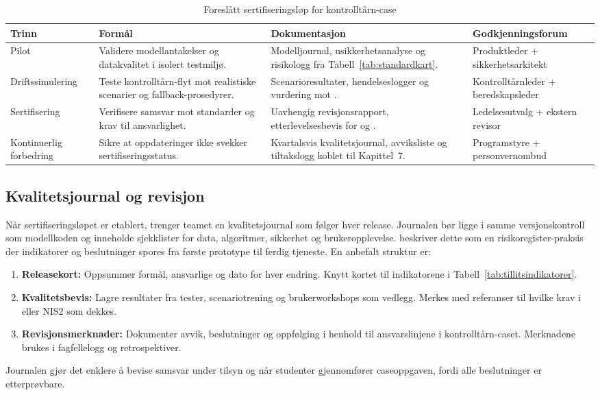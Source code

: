 \begin{table}[ht]
    \centering
    \caption{Foreslått sertifiseringsløp for kontrolltårn-case}
    \label{tab:sertifiseringslop}
    \begin{tabular}{p{2.2cm}p{4.3cm}p{4.5cm}p{3.0cm}}
        \toprule
        \textbf{Trinn} & \textbf{Formål} & \textbf{Dokumentasjon} & \textbf{Godkjenningsforum} \\
        \midrule
        Pilot & Validere modellantakelser og datakvalitet i isolert testmiljø. & Modelljournal, usikkerhetsanalyse og risikologg fra Tabell~\ref{tab:standardkart}. & Produktleder + sikkerhetsarkitekt \\
        \addlinespace
        Driftssimulering & Teste kontrolltårn-flyt mot realistiske scenarier og fallback-prosedyrer. & Scenarioresultater, hendelseslogger og vurdering mot \citet{nist2023airmf}. & Kontrolltårnleder + beredskapsleder \\
        \addlinespace
        Sertifisering & Verifisere samsvar mot standarder og krav til ansvarlighet. & Uavhengig revisjonsrapport, etterlevelsesbevis for \citet{iso2020tr24028} og \citet{dnv2023digitalassurance}. & Ledelsesutvalg + ekstern revisor \\
        \addlinespace
        Kontinuerlig forbedring & Sikre at oppdateringer ikke svekker sertifiseringsstatus. & Kvartalsvis kvalitetsjournal, avviksliste og tiltakslogg koblet til Kapittel~7. & Programstyre + personvernombud \\
        \bottomrule
    \end{tabular}
\end{table}

\subsection{Kvalitetsjournal og revisjon}
Når sertifiseringsløpet er etablert, trenger teamet en kvalitetsjournal som følger hver release. Journalen bør ligge i samme versjonskontroll som modellkoden og inneholde sjekklister for data, algoritmer, sikkerhet og brukeropplevelse. \citet{nist2023airmf} beskriver dette som en risikoregister-praksis der indikatorer og beslutninger spores fra første prototype til ferdig tjeneste. En anbefalt struktur er:
\begin{enumerate}
    \item \textbf{Releasekort:} Oppsummer formål, ansvarlige og dato for hver endring. Knytt kortet til indikatorene i Tabell~\ref{tab:tillitsindikatorer}.
    \item \textbf{Kvalitetsbevis:} Lagre resultater fra tester, scenariotrening og brukerworkshops som vedlegg. Merkes med referanser til hvilke krav i \citet{iso2020tr24028} eller NIS2 som dekkes.
    \item \textbf{Revisjonsmerknader:} Dokumenter avvik, beslutninger og oppfølging i henhold til ansvarslinjene i kontrolltårn-caset. Merknadene brukes i fagfellelogg og retrospektiver.
\end{enumerate}
Journalen gjør det enklere å bevise samsvar under tilsyn og når studenter gjennomfører caseoppgaven, fordi alle beslutninger er etterprøvbare.

